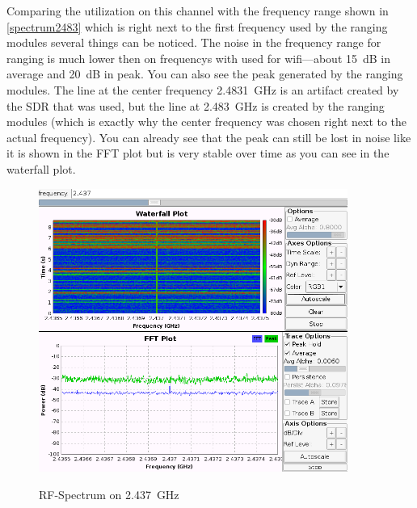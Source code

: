 Comparing the utilization on this channel with the frequency range shown in \autoref{spectrum2483} which is right next to the first frequency used by the ranging modules several things can be noticed.
The noise in the frequency range for ranging is much lower then on frequencys with used for wifi—about \SI{15}{dB} in average and \SI{20}{dB} in peak.
You can also see the peak generated by the ranging modules.
The line at the center frequency \SI{2.4831}{\giga\hertz} is an artifact created by the SDR that was used, but the line at \SI{2.483}{\giga\hertz} is created by the ranging modules (which is exactly why the center frequency was chosen right next to the actual frequency).
You can already see that the peak can still be lost in noise like it is shown in the FFT plot but is very stable over time as you can see in the waterfall plot.

\begin{figure}[H]
	\centering
\includegraphics[width=0.9\textwidth]{figures/ch6.png}
\label{spectrum2437}
\caption{RF-Spectrum on \SI{2.437}{\giga\hertz}}
\end{figure}

